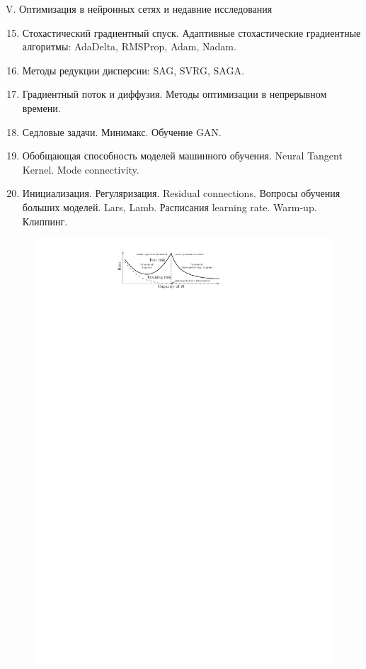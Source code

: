 \documentclass[9pt, aspectratio=169]{beamer}
\begin{document}
\begin{frame}{V. Оптимизация в нейронных сетях и недавние исследования}
    \begin{minipage}{0.618\textwidth}
        \begin{enumerate}
            \setcounter{enumi}{14}
            \item Стохастический градиентный спуск. Адаптивные стохастические градиентные алгоритмы: AdaDelta, RMSProp, Adam, Nadam.
            \item Методы редукции дисперсии: SAG, SVRG, SAGA.
            \item Градиентный поток и диффузия. Методы оптимизации в непрерывном времени.
            \item Седловые задачи. Минимакс. Обучение GAN.
            \item Обобщающая способность моделей машинного обучения. Neural Tangent Kernel. Mode connectivity.
            \item Инициализация. Регуляризация. Residual connections. Вопросы обучения больших моделей. Lars, Lamb. Расписания learning rate. Warm-up. Клиппинг.
        \end{enumerate}
      \end{minipage}%
      \begin{minipage}{0.382\textwidth}
        \begin{figure}
            \centering
            \includegraphics[width=\linewidth]{doubledescent}

\end{figure}
\end{minipage}
\end{frame}
\end{document}
